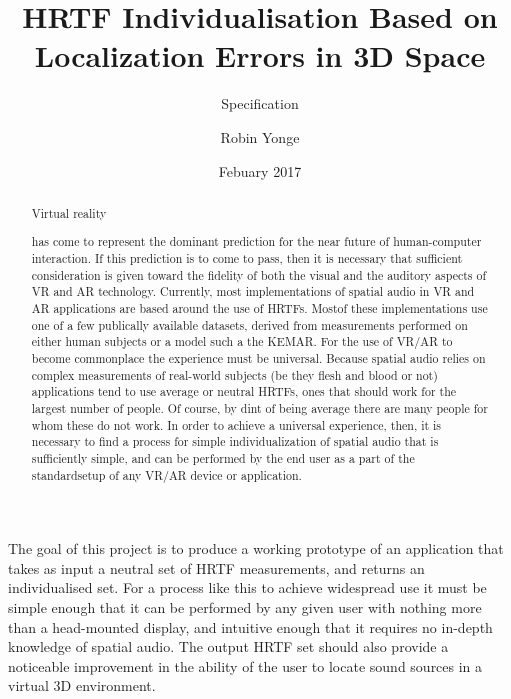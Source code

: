 \documentclass[10pt, oneside, a4paper, draft]{scrartcl}
\begin{document}

\title{HRTF Individualisation Based on Localization Errors in 3D Space}
\subtitle{Specification}
\author{Robin Yonge}
\date{Febuary 2017}
\maketitle

\renewcommand{\abtractname}{Introduction} %
\begin {abstract}
Virtual reality has come to represent the dominant prediction for the near future of human-computer interaction. If this prediction is to come to pass, then it is necessary that sufficient consideration is given toward the fidelity of both the visual and the auditory aspects of VR and AR technology. Currently, most implementations of spatial audio in VR and AR applications are based around the use of HRTFs. Mostof these implementations use one of a few publically available datasets, derived from measurements performed on either human subjects or a model such a the KEMAR\cite{Algazi2001}\cite{Gardner1994}. For the use of VR/AR to become commonplace the experience must be universal. Because spatial audio relies on complex measurements of real-world subjects (be they flesh and blood or not) applications tend to use average or neutral HRTFs, ones that should work for the largest number of people. Of course, by dint of being average there are many people for whom these do not work. In order to achieve a universal experience, then, it is necessary to find a process for  simple individualization of spatial audio that is sufficiently simple, and can be performed by the end user as a part of the standardsetup of any VR/AR device or application.
\end {abstract}

\section*{}
The goal of this project is to produce a working prototype of an application that takes as input a neutral set of HRTF measurements, and returns an individualised set. For a process like this to achieve widespread use it must be simple enough that it can be performed by any given user with nothing more than a head-mounted display, and intuitive enough that it requires no in-depth knowledge of spatial audio. The output HRTF set should also provide a noticeable improvement in the ability of the user to locate sound sources in a virtual 3D environment.
\end{document}
